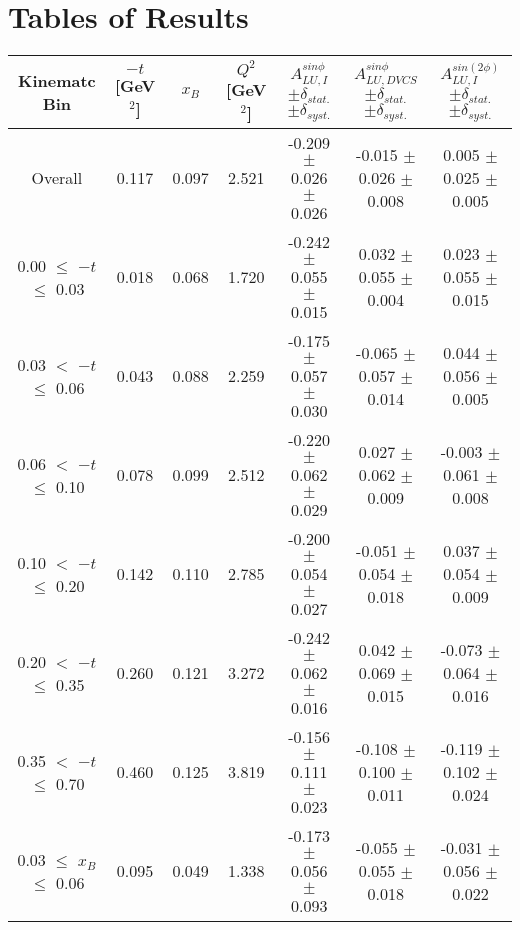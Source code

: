 \appendix
\setcounter{equation}{0}

\section{Tables of Results}


\begin{table}[width=15cm]
 \begin{center}
\resizebox{16cm}{!} {
  \begin{tabular}{|c|c|c|c|c|c|c|}
\hline
Kinematc Bin &  $-t$ [GeV$^{2}$] & $x_{B}$ & $Q^{2}$ [GeV$^{2}$] & 
$A^{sin \phi}_{LU,I}$ $\pm \delta_{stat.}$ $\pm \delta_{syst.}$ & $A^{sin \phi}_{LU,DVCS}$ $\pm \delta_{stat.}$ $\pm \delta_{syst.}$
& $A^{sin (2\phi)}_{LU,I}$ $\pm \delta_{stat.}$ $\pm \delta_{syst.}$ \\
\hline
\hline
Overall &  0.117 & 0.097 &  2.521 &  -0.209  $\pm$  0.026  $\pm$   0.026 &
 -0.015  $\pm$  0.026  $\pm$  0.008 & 0.005  $\pm$  0.025  $\pm$   0.005 \\
\hline
0.00 $\leqslant$ $-t$ $\leqslant$ 0.03 &  0.018 & 0.068 &  1.720 &  -0.242  $\pm$  0.055  $\pm$   0.015 &
 0.032  $\pm$  0.055   $\pm$  0.004 & 0.023  $\pm$  0.055  $\pm$   0.015\\
0.03 $<$ $-t$ $\leqslant$ 0.06 &  0.043 & 0.088 &  2.259&  -0.175 $\pm$   0.057   $\pm$  0.030 &
 -0.065 $\pm$   0.057  $\pm$   0.014 & 0.044  $\pm$  0.056  $\pm$   0.005\\
0.06 $<$ $-t$ $\leqslant$ 0.10 &  0.078 & 0.099 &  2.512 & -0.220 $\pm$   0.062   $\pm$  0.029 &
 0.027  $\pm$  0.062  $\pm$   0.009 & -0.003  $\pm$  0.061   $\pm$  0.008 \\
0.10 $<$ $-t$ $\leqslant$ 0.20 &  0.142 & 0.110 &  2.785 &  -0.200 $\pm$   0.054  $\pm$   0.027 &
-0.051  $\pm$  0.054  $\pm$   0.018 & 0.037  $\pm$  0.054  $\pm$  0.009\\
0.20 $<$ $-t$ $\leqslant$ 0.35 &  0.260 & 0.121 &  3.272 &  -0.242 $\pm$   0.062  $\pm$   0.016 &
0.042  $\pm$  0.069  $\pm$   0.015 & -0.073 $\pm$   0.064   $\pm$  0.016\\
0.35 $<$ $-t$ $\leqslant$ 0.70 &  0.460 & 0.125 &  3.819 &  -0.156  $\pm$  0.111  $\pm$   0.023 & 
-0.108  $\pm$  0.100   $\pm$  0.011 & -0.119 $\pm$   0.102  $\pm$   0.024\\
\hline
0.03 $\leqslant$ $x_{B}$ $\leqslant$ 0.06 &  0.095 & 0.049 &  1.338 &  -0.173  $\pm$  0.056  $\pm$   0.093 &
-0.055 $\pm$   0.055  $\pm$   0.018 & -0.031  $\pm$  0.056  $\pm$   0.022\\

\end{tabular}}
\end{center}
\end{table}
